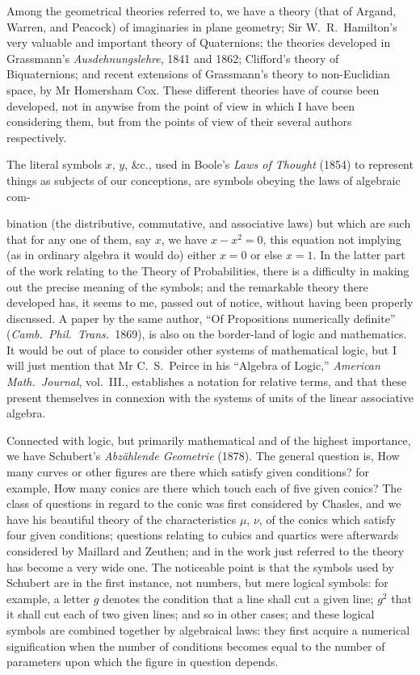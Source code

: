 \documentclass[12pt,a4paper,oneside]{book}
\begin{document}
Among the geometrical theories referred to, we have a theory (that of Argand, Warren, and Peacock) of imaginaries in plane geometry; Sir W.~R.~Hamilton's very valuable and important theory of Quaternions; the theories developed in Grassmann's \textit{Ausdehnungslehre}, 1841 and 1862; Clifford's theory of Biquaternions; and recent extensions of Grassmann's theory to non-Euclidian space, by Mr Homersham Cox. These different theories have of course been developed, not in anywise from the point of view in which I have been considering them, but from the points of view of their several authors respectively.

The literal symbols $x$, $y$, \&c., used in Boole's \textit{Laws of Thought} (1854) to represent things as subjects of our conceptions, are symbols obeying the laws of algebraic com-

\newpage
bination (the distributive, commutative, and associative laws) but which are such that for any one of them, say $x$, we have $x-x^{2}=0$, this equation not implying (as in ordinary algebra it would do) either $x=0$ or else $x=1$. In the latter part of the work relating to the Theory of Probabilities, there is a difficulty in making out the precise meaning of the symbols; and the remarkable theory there developed has, it seems to me, passed out of notice, without having been properly discussed. A paper by the same author, ``Of Propositions numerically definite'' (\textit{Camb.\ Phil.\ Trans.}\ 1869), is also on the border-land of logic and mathematics. It would be out of place to consider other systems of mathematical logic, but I will just mention that Mr C.~S.~Peirce in his ``Algebra of Logic,'' \textit{American Math.\ Journal}, vol.~III., establishes a notation for relative terms, and that these present themselves in connexion with the systems of units of the linear associative algebra.

Connected with logic, but primarily mathematical and of the highest importance, we have Schubert's \textit{Abz\"ahlende Geometrie} (1878). The general question is, How many curves or other figures are there which satisfy given conditions? for example, How many conics are there which touch each of five given conics? The class of questions in regard to the conic was first considered by Chasles, and we have his beautiful theory of the characteristics $\mu$, $\nu$, of the conics which satisfy four given conditions; questions relating to cubics and quartics were afterwards considered by Maillard and Zeuthen; and in the work just referred to the theory has become a very wide one. The noticeable point is that the symbols used by Schubert are in the first instance, not numbers, but mere logical symbols: for example, a letter $g$ denotes the condition that a line shall cut a given line; $g^{2}$ that it shall cut each of two given lines; and so in other cases; and these logical symbols are combined together by algebraical laws: they first acquire a numerical signification when the number of conditions becomes equal to the number of parameters upon which the figure in question depends.
\end{document}
